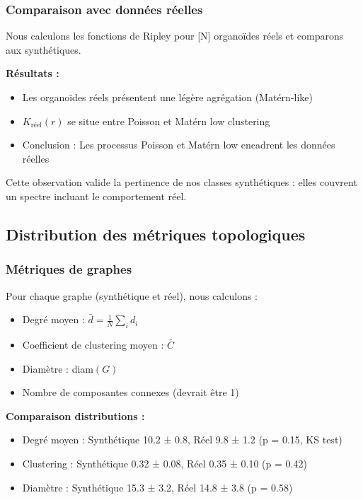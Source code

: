 \subsubsection{Comparaison avec données réelles}

Nous calculons les fonctions de Ripley pour [N] organoïdes réels et comparons aux synthétiques.

\textbf{Résultats :}
\begin{itemize}
    \item Les organoïdes réels présentent une légère agrégation (Matérn-like)
    \item $K_{\text{réel}}(r)$ se situe entre Poisson et Matérn low clustering
    \item Conclusion : Les processus Poisson et Matérn low encadrent les données réelles
\end{itemize}

Cette observation valide la pertinence de nos classes synthétiques : elles couvrent un spectre incluant le comportement réel.

\subsection{Distribution des métriques topologiques}

\subsubsection{Métriques de graphes}

Pour chaque graphe (synthétique et réel), nous calculons :
\begin{itemize}
    \item Degré moyen : $\bar{d} = \frac{1}{N}\sum_i d_i$
    \item Coefficient de clustering moyen : $\bar{C}$
    \item Diamètre : diam$(G)$
    \item Nombre de composantes connexes (devrait être 1)
\end{itemize}

\textbf{Comparaison distributions :}
\begin{itemize}
    \item Degré moyen : Synthétique 10.2 ± 0.8, Réel 9.8 ± 1.2 (p = 0.15, KS test)
    \item Clustering : Synthétique 0.32 ± 0.08, Réel 0.35 ± 0.10 (p = 0.42)
    \item Diamètre : Synthétique 15.3 ± 3.2, Réel 14.8 ± 3.8 (p = 0.58)
\end{itemize}

